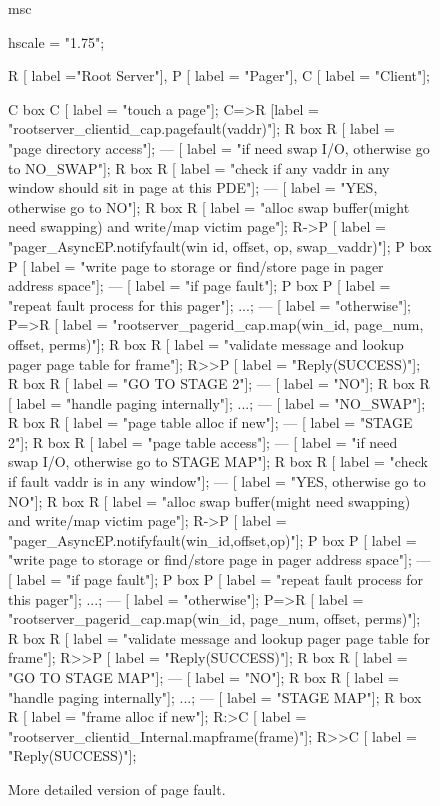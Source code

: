 \begin{figure}[htb]
  \begin{center}
    \begin{msc}
      msc {
      	hscale = "1.75";
      	
        R [ label ="Root Server"],
        P [ label = "Pager"],
        C [ label = "Client"];

        C box C [ label = "touch a page"];
        C=>R [label = "rootserver\_clientid\_cap.pagefault(vaddr)"];
        R box R [ label = "page directory access"];
        --- [ label = "if need swap I/O, otherwise go to NO\_SWAP"];
        R box R [ label = "check if any vaddr in any window should sit in page at this PDE"];
        --- [ label = "YES, otherwise go to NO"];
        R box R [ label = "alloc swap buffer(might need swapping) and write/map victim page"];
        R->P [ label = "pager\_AsyncEP.notifyfault(win id, offset, op, swap\_vaddr)"];
        P box P [ label = "write page to storage or find/store page in pager address space"];
        --- [ label = "if page fault"];
        P box P [ label = "repeat fault process for this pager"];
        ...;
        --- [ label = "otherwise"];
        P=>R [ label = "rootserver\_pagerid\_cap.map(win\_id, page\_num, offset, perms)"];
        R box R [ label = "validate message and lookup pager page table for frame"];
        R>>P [ label = "Reply(SUCCESS)"];
        R box R [ label = "GO TO STAGE 2"];
        --- [ label = "NO"];
        R box R [ label = "handle paging internally"];
        ...;
        --- [ label = "NO\_SWAP"];
        R box R [ label = "page table alloc if new"];
        --- [ label = "STAGE 2"];
        R box R [ label = "page table access"];
        --- [ label = "if need swap I/O, otherwise go to STAGE MAP"];
        R box R [ label = "check if fault vaddr is in any window"];
        --- [ label = "YES, otherwise go to NO"];
        R box R [ label = "alloc swap buffer(might need swapping) and write/map victim page"];
        R->P [ label = "pager\_AsyncEP.notifyfault(win\_id,offset,op)"];
        P box P [ label = "write page to storage or find/store page in pager address space"];
        --- [ label = "if page fault"];
        P box P [ label = "repeat fault process for this pager"];
        ...;
        --- [ label = "otherwise"];
        P=>R [ label = "rootserver\_pagerid\_cap.map(win\_id, page\_num, offset, perms)"];
        R box R [ label = "validate message and lookup pager page table for frame"];
        R>>P [ label = "Reply(SUCCESS)"];
        R box R [ label = "GO TO STAGE MAP"];
        --- [ label = "NO"];
        R box R [ label = "handle paging internally"];
        ...;
        --- [ label = "STAGE MAP"];
        R box R [ label = "frame alloc if new"];
        R:>C [ label = "rootserver\_clientid\_Internal.mapframe(frame)"];
        R>>C [ label = "Reply(SUCCESS)"];
      }
    \end{msc}
  \end{center}
  \caption{More detailed version of page fault.}
\end{figure}

